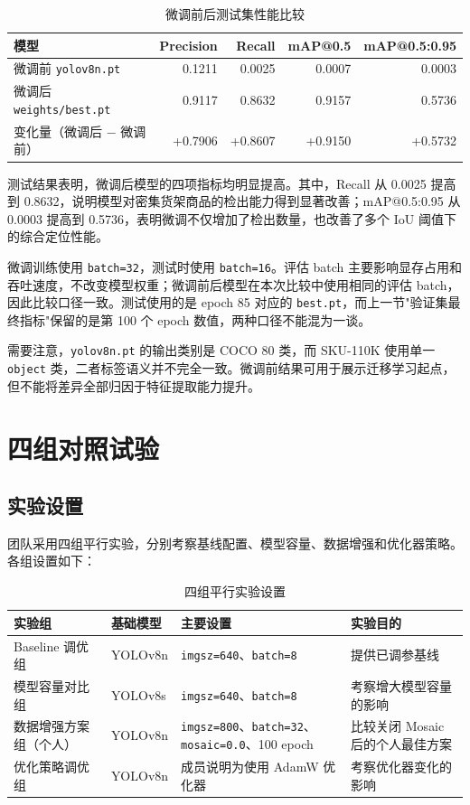 \documentclass[12pt,a4paper]{ctexart}
\begin{document}
\begin{table}[H]
\centering
\caption{微调前后测试集性能比较}
\begin{tabular}{lrrrr}
\toprule
\textbf{模型} & \textbf{Precision} & \textbf{Recall} & \textbf{mAP@0.5} & \textbf{mAP@0.5:0.95} \\
\midrule
微调前 \texttt{yolov8n.pt} & 0.1211 & 0.0025 & 0.0007 & 0.0003 \\
微调后 \texttt{weights/best.pt} & 0.9117 & 0.8632 & 0.9157 & 0.5736 \\
\midrule
变化量（微调后 $-$ 微调前） & +0.7906 & +0.8607 & +0.9150 & +0.5732 \\
\bottomrule
\end{tabular}
\end{table}

测试结果表明，微调后模型的四项指标均明显提高。其中，Recall 从 0.0025 提高到 0.8632，说明模型对密集货架商品的检出能力得到显著改善；mAP@0.5:0.95 从 0.0003 提高到 0.5736，表明微调不仅增加了检出数量，也改善了多个 IoU 阈值下的综合定位性能。

微调训练使用 \texttt{batch=32}，测试时使用 \texttt{batch=16}。评估 batch 主要影响显存占用和吞吐速度，不改变模型权重；微调前后模型在本次比较中使用相同的评估 batch，因此比较口径一致。测试使用的是 epoch 85 对应的 \texttt{best.pt}，而上一节"验证集最终指标"保留的是第 100 个 epoch 数值，两种口径不能混为一谈。

需要注意，\texttt{yolov8n.pt} 的输出类别是 COCO 80 类，而 SKU-110K 使用单一 \texttt{object} 类，二者标签语义并不完全一致。微调前结果可用于展示迁移学习起点，但不能将差异全部归因于特征提取能力提升。

\section{四组对照试验}

\subsection{实验设置}

团队采用四组平行实验，分别考察基线配置、模型容量、数据增强和优化器策略。各组设置如下：

\begin{table}[H]
\centering
\caption{四组平行实验设置}
\small
\begin{tabular}{p{2.8cm}p{1.8cm}p{5.0cm}p{3.8cm}}
\toprule
\textbf{实验组} & \textbf{基础模型} & \textbf{主要设置} & \textbf{实验目的} \\
\midrule
Baseline 调优组 & YOLOv8n & \texttt{imgsz=640}、\texttt{batch=8} & 提供已调参基线 \\
模型容量对比组 & YOLOv8s & \texttt{imgsz=640}、\texttt{batch=8} & 考察增大模型容量的影响 \\
数据增强方案组（个人） & YOLOv8n & \texttt{imgsz=800}、\texttt{batch=32}、\texttt{mosaic=0.0}、100 epoch & 比较关闭 Mosaic 后的个人最佳方案 \\
优化策略调优组 & YOLOv8n & 成员说明为使用 AdamW 优化器 & 考察优化器变化的影响 \\
\bottomrule
\end{tabular}
\end{table}
\end{document}
